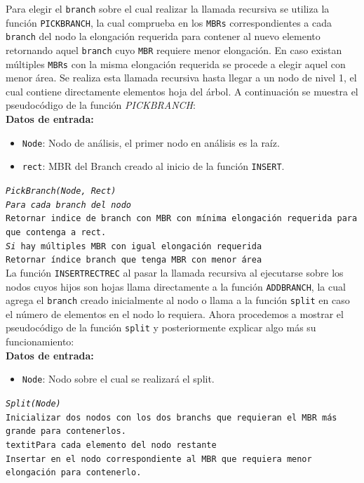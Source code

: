 \documentclass[a4paper]{article}
\newcommand\tab[1][0.5cm]{\hspace*{#1}}
\begin{document}
Para elegir el \texttt{branch} sobre el cual realizar la llamada recursiva se utiliza la función \texttt{PICKBRANCH}, la cual comprueba en los \texttt{MBRs} correspondientes a cada \texttt{branch} del nodo la elongación requerida para contener al nuevo elemento retornando aquel \texttt{branch} cuyo \texttt{MBR} requiere menor elongación. En caso existan múltiples \texttt{MBRs} con la misma elongación requerida se procede a elegir aquel con menor área. Se realiza esta llamada recursiva hasta llegar a un nodo de nivel 1, el cual contiene directamente elementos hoja del árbol. A continuación se muestra el pseudocódigo de la función \textit{PICKBRANCH}:\\

\textbf{Datos de entrada:}
\begin{itemize}
    \item \texttt{Node}: Nodo de análisis, el primer nodo en análisis es la raíz.
    \item \texttt{rect}: MBR del Branch creado al inicio de la función \texttt{INSERT}.
\end{itemize}

\texttt{\textit{PickBranch(Node, Rect)}}\\
\tab \texttt{\textit{Para cada branch del nodo}}\\
\tab \tab \texttt{Retornar indice de branch con MBR con mínima elongación requerida para que contenga a rect.}\\
\tab \tab \texttt{\textit{Si} hay múltiples MBR con igual elongación requerida}\\
\tab \tab \tab \texttt{Retornar índice branch que tenga MBR con menor área}\\

La función \texttt{INSERTRECTREC} al pasar la llamada recursiva al ejecutarse sobre los nodos cuyos hijos son hojas llama directamente a la función \texttt{ADDBRANCH}, la cual agrega el \texttt{branch} creado inicialmente al nodo o llama a la función \texttt{split} en caso el número de elementos en el nodo lo requiera. Ahora procedemos a mostrar el pseudocódigo de la función \texttt{split} y posteriormente explicar algo más su funcionamiento:\\

\textbf{Datos de entrada:}
\begin{itemize}
    \item \texttt{Node}: Nodo sobre el cual se realizará el split.
\end{itemize}

\texttt{\textit{Split(Node)}}\\
\tab \tab \texttt{Inicializar dos nodos con los dos branchs que requieran el MBR más grande para contenerlos.}\\
\tab \tab \texttt{textit{Para cada elemento del nodo restante}}\\
\tab \tab \tab \texttt{Insertar en el nodo correspondiente al MBR que requiera menor elongación para contenerlo.}\\
\end{document}
